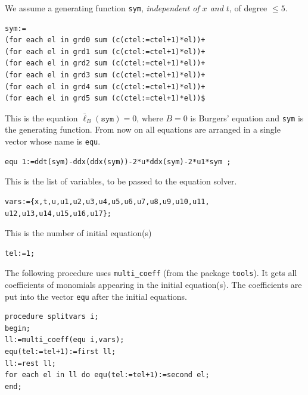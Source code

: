 We assume a generating function \texttt{sym}, \emph{independent of $x$ and
  $t$}, of degree $\leq 5$.
\begin{verbatim}
sym:=
(for each el in grd0 sum (c(ctel:=ctel+1)*el))+
(for each el in grd1 sum (c(ctel:=ctel+1)*el))+
(for each el in grd2 sum (c(ctel:=ctel+1)*el))+
(for each el in grd3 sum (c(ctel:=ctel+1)*el))+
(for each el in grd4 sum (c(ctel:=ctel+1)*el))+
(for each el in grd5 sum (c(ctel:=ctel+1)*el))$
\end{verbatim}

This is the equation $\bar\ell_B(\mathtt{sym})=0$, where $B=0$ is
Burgers' equation and \texttt{sym} is the generating function. From now on all
equations are arranged in a single vector whose name is \texttt{equ}.
\begin{verbatim}
equ 1:=ddt(sym)-ddx(ddx(sym))-2*u*ddx(sym)-2*u1*sym ;
\end{verbatim}

This is the list of variables, to be passed to the equation solver.
\begin{verbatim}
vars:={x,t,u,u1,u2,u3,u4,u5,u6,u7,u8,u9,u10,u11,
u12,u13,u14,u15,u16,u17};
\end{verbatim}

This is the number of initial equation(s)
\begin{verbatim}
tel:=1;
\end{verbatim}

\hypertarget{operator:MULTI_COEFF}{}
The following procedure uses \texttt{multi\_coeff} (from the package
\texttt{tools}).  It gets all coefficients of monomials appearing in the
initial equation(s).  The coefficients are put into the vector \texttt{equ}
after the initial equations.
\begin{verbatim}
procedure splitvars i;
begin;
ll:=multi_coeff(equ i,vars);
equ(tel:=tel+1):=first ll;
ll:=rest ll;
for each el in ll do equ(tel:=tel+1):=second el;
end;
\end{verbatim}

